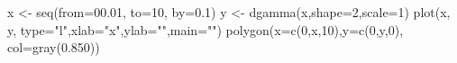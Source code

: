 \begin{Schunk}
\begin{Sinput}
 x <- seq(from=00.01, to=10, by=0.1)
 y <- dgamma(x,shape=2,scale=1) 
 plot(x, y, type="l",xlab="x",ylab="",main="")
 polygon(x=c(0,x,10),y=c(0,y,0), col=gray(0.850))
\end{Sinput}
\end{Schunk}
